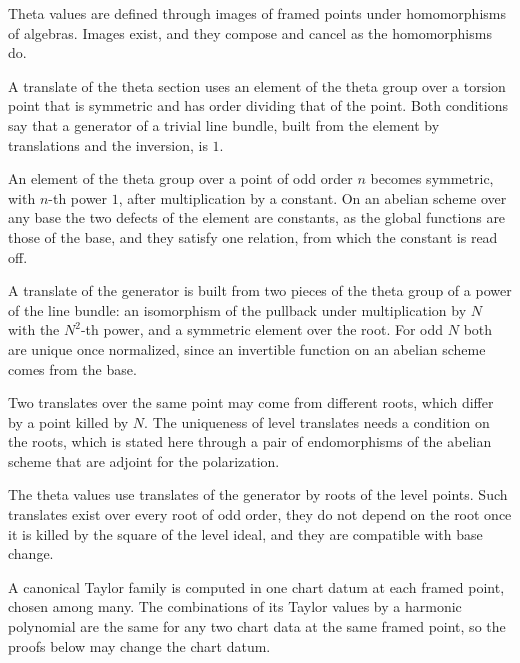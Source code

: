 Theta values are defined through images of framed points under homomorphisms of algebras. Images exist, and they
compose and cancel as the homomorphisms do.

A translate of the theta section uses an element of the theta group over a torsion point that is symmetric and has
order dividing that of the point. Both conditions say that a generator of a trivial line bundle, built from the
element by translations and the inversion, is $1$.

An element of the theta group over a point of odd order $n$ becomes symmetric, with $n$-th power $1$, after
multiplication by a constant. On an abelian scheme over any base the two defects of the element are constants, as
the global functions are those of the base, and they satisfy one relation, from which the constant is read off.

A translate of the generator is built from two pieces of the theta group of a power of the line bundle: an
isomorphism of the pullback under multiplication by $N$ with the $N^2$-th power, and a symmetric element over the root.
For odd $N$ both are unique once normalized, since an invertible function on an abelian scheme comes from the base.

Two translates over the same point may come from different roots, which differ by a point killed by $N$. The
uniqueness of level translates needs a condition on the roots, which is stated here through a pair of endomorphisms
of the abelian scheme that are adjoint for the polarization.

The theta values use translates of the generator by roots of the level points. Such translates exist over every
root of odd order, they do not depend on the root once it is killed by the square of the level ideal, and they are
compatible with base change.

A canonical Taylor family is computed in one chart datum at each framed point, chosen among many. The combinations of
its Taylor values by a harmonic polynomial are the same for any two chart data at the same framed point, so the proofs
below may change the chart datum.

